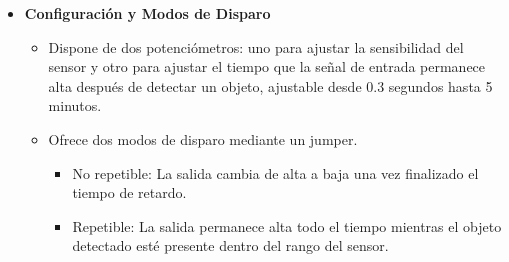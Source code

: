 \documentclass{report}
\begin{document}
\begin{itemize}
    \item \textbf{Configuración y Modos de Disparo}
    \begin{itemize}
        \item Dispone de dos potenciómetros: uno para ajustar la sensibilidad del sensor y otro para ajustar el tiempo que la señal de entrada permanece alta 
        después de detectar un objeto, ajustable desde 0.3 segundos hasta 5 minutos.
        \item Ofrece dos modos de disparo mediante un jumper.
            \begin{itemize}
                \item No repetible: La salida cambia de alta a baja una vez finalizado el tiempo de retardo.
                \item Repetible: La salida permanece alta todo el tiempo mientras el objeto detectado esté presente dentro del rango del sensor.
            \end{itemize}
    \end{itemize}
\end{itemize}
\end{document}
